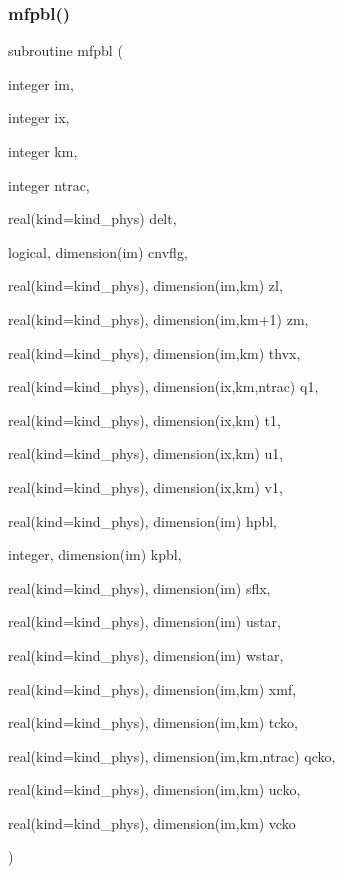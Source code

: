 \subsubsection{\texorpdfstring{mfpbl()}{mfpbl()}}
{\footnotesize\ttfamily subroutine mfpbl (\begin{DoxyParamCaption}\item[{integer}]{im,  }\item[{integer}]{ix,  }\item[{integer}]{km,  }\item[{integer}]{ntrac,  }\item[{real(kind=kind\+\_\+phys)}]{delt,  }\item[{logical, dimension(im)}]{cnvflg,  }\item[{real(kind=kind\+\_\+phys), dimension(im,km)}]{zl,  }\item[{real(kind=kind\+\_\+phys), dimension(im,km+1)}]{zm,  }\item[{real(kind=kind\+\_\+phys), dimension(im,km)}]{thvx,  }\item[{real(kind=kind\+\_\+phys), dimension(ix,km,ntrac)}]{q1,  }\item[{real(kind=kind\+\_\+phys), dimension(ix,km)}]{t1,  }\item[{real(kind=kind\+\_\+phys), dimension(ix,km)}]{u1,  }\item[{real(kind=kind\+\_\+phys), dimension(ix,km)}]{v1,  }\item[{real(kind=kind\+\_\+phys), dimension(im)}]{hpbl,  }\item[{integer, dimension(im)}]{kpbl,  }\item[{real(kind=kind\+\_\+phys), dimension(im)}]{sflx,  }\item[{real(kind=kind\+\_\+phys), dimension(im)}]{ustar,  }\item[{real(kind=kind\+\_\+phys), dimension(im)}]{wstar,  }\item[{real(kind=kind\+\_\+phys), dimension(im,km)}]{xmf,  }\item[{real(kind=kind\+\_\+phys), dimension(im,km)}]{tcko,  }\item[{real(kind=kind\+\_\+phys), dimension(im,km,ntrac)}]{qcko,  }\item[{real(kind=kind\+\_\+phys), dimension(im,km)}]{ucko,  }\item[{real(kind=kind\+\_\+phys), dimension(im,km)}]{vcko }\end{DoxyParamCaption})}

